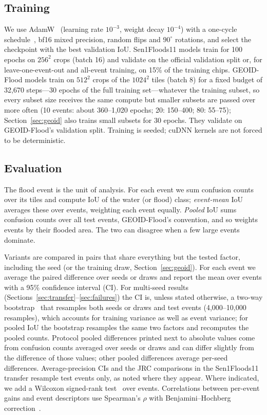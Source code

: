 \subsection{Training}
We use AdamW~\cite{loshchilov2019adamw} (learning rate $10^{-3}$, weight decay $10^{-4}$) with a one-cycle
schedule~\cite{smith2019superconvergence}, bf16 mixed precision, random flips and $90^\circ$ rotations,
and select the checkpoint with the best validation IoU. Sen1Floods11 models train for 100 epochs on
$256^2$ crops (batch 16) and validate on the official validation split or, for leave-one-event-out and
all-event training, on 15\% of the training chips. GEOID-Flood models
train on $512^2$ crops of the $1024^2$ tiles (batch 8) for a fixed budget of 32,670 steps---30 epochs of
the full training set---whatever the training subset, so every subset size receives the same compute
but smaller subsets are passed over more often (10 events: about 360--1,020 epochs; 20: 150--400; 80:
55--75); Section~\ref{sec:geoid} also trains small subsets for 30 epochs. They validate on GEOID-Flood's
validation split. Training is seeded; cuDNN kernels are not forced to be
deterministic.

\subsection{Evaluation}
The flood event is the unit of analysis. For each event we sum confusion counts over its tiles and compute
IoU of the water (or flood) class; \emph{event-mean} IoU averages these over events, weighting each event
equally. \emph{Pooled} IoU sums confusion counts over all test events, GEOID-Flood's convention, and so
weights events by their flooded area. The two can disagree when a few large events dominate.

Variants are compared in pairs that share everything but the tested factor, including the seed (or the
training draw, Section~\ref{sec:geoid}). For each event we average the paired difference over seeds or
draws and report the mean over events with a 95\% confidence interval (CI). For multi-seed results
(Sections~\ref{sec:transfer}--\ref{sec:failures}) the CI is, unless stated otherwise, a two-way
bootstrap~\cite{efron1993bootstrap} that resamples both seeds or draws and test events (4,000--10,000
resamples), which accounts for training variance as well as event variance; for pooled IoU the bootstrap
resamples the same two factors and recomputes the pooled counts. Protocol pooled differences printed next to
absolute \iouf{} values come from confusion counts averaged over seeds or draws and can differ slightly
from the difference of those values; other pooled differences average per-seed differences. Average-precision CIs and the JRC comparisons in the Sen1Floods11
transfer resample test events only, as noted where they appear. Where indicated, we add a Wilcoxon signed-rank
test~\cite{wilcoxon1945} over events. Correlations between per-event gains and event descriptors use
Spearman's $\rho$ with Benjamini--Hochberg correction~\cite{benjamini1995fdr}.

